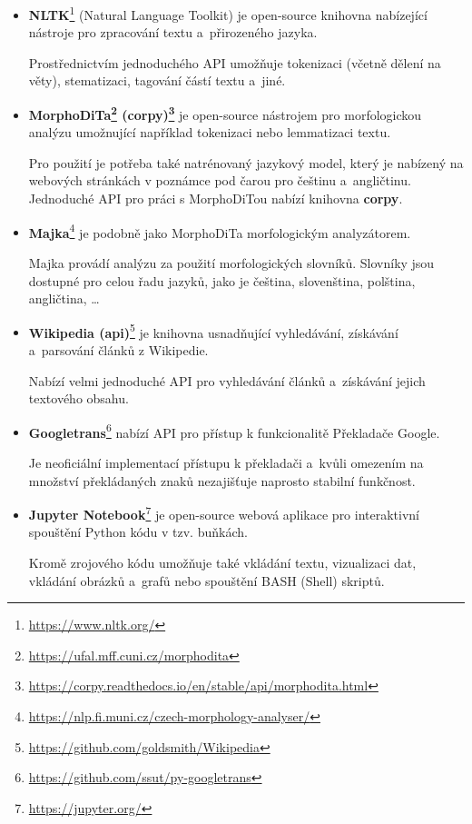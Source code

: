 \begin{itemize}
    \item \textbf{NLTK}\footnote{\url{https://www.nltk.org/}}
    (Natural Language Toolkit) je open-source knihovna nabízející nástroje pro zpracování textu a~přirozeného jazyka.\par Prostřednictvím jednoduchého API umožňuje tokenizaci (včetně dělení na věty), stematizaci, tagování částí textu a~jiné. 
    
    \item \textbf{MorphoDiTa\footnote{\url{https://ufal.mff.cuni.cz/morphodita}} (corpy)\footnote{\url{https://corpy.readthedocs.io/en/stable/api/morphodita.html}}}
    je open-source nástrojem pro morfologickou analýzu umožnující například tokenizaci nebo lemmatizaci textu.\par
    Pro použití je potřeba také natrénovaný jazykový model, který je nabízený na webových stránkách v poznámce pod čarou pro češtinu a~angličtinu. Jednoduché API pro práci s MorphoDiTou nabízí knihovna \textbf{corpy}.
    
    \item \textbf{Majka}\footnote{\url{https://nlp.fi.muni.cz/czech-morphology-analyser/}}
    je podobně jako MorphoDiTa morfologickým analyzátorem.\par Majka provádí analýzu za použití morfologických slovníků. Slovníky jsou dostupné pro celou řadu jazyků, jako je čeština, slovenština, polština, angličtina, \dots
    
    \item \textbf{Wikipedia (api)}\footnote{\url{https://github.com/goldsmith/Wikipedia}}
    je knihovna usnadňující vyhledávání, získávání a~parsování článků z Wikipedie. \par Nabízí velmi jednoduché API pro vyhledávání článků a~získávání jejich textového obsahu.
    
    \item \textbf{Googletrans}\footnote{\url{https://github.com/ssut/py-googletrans}}
    nabízí API pro přístup k funkcionalitě Překladače Google. \par
    Je neoficiální implementací přístupu k překladači a~kvůli omezením na množství překládaných znaků nezajišťuje naprosto stabilní funkčnost.
    
    \item \textbf{Jupyter Notebook}\footnote{\url{https://jupyter.org/}} 
    je open-source webová aplikace pro interaktivní spouštění Python kódu v tzv. buňkách.\par
    Kromě zrojového kódu umožňuje také vkládání textu, vizualizaci dat, vkládání obrázků a~grafů nebo spouštění BASH (Shell) skriptů.
    

\end{itemize}
